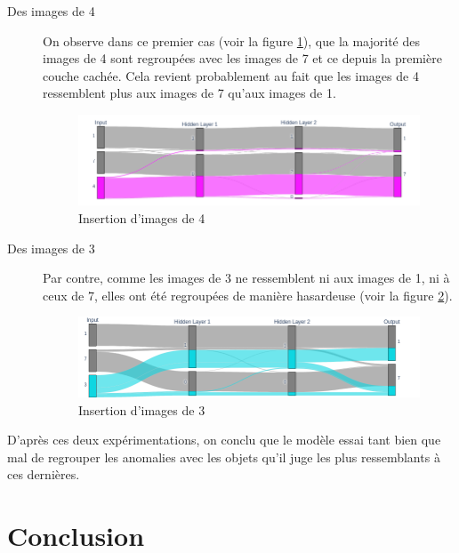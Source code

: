 \documentclass[oneside,13pt,a4paper]{report}
\begin{document}
\begin{description}
\item[Des images de 4] On observe dans ce premier cas (voir la figure \ref{expe1}), que la majorité des images de 4 sont regroupées avec les images de 7 et ce depuis la première couche cachée. Cela revient probablement au fait que les images de 4 ressemblent plus aux images de 7 qu'aux images de 1.

\begin{figure}[!h]
\begin{center}
\includegraphics[width=1.0\textwidth]{img/anomalie4_sankey.png}
\caption{Insertion d'images de 4}
\label{expe1}
\end{center}
\end{figure}

\item[Des images de 3] Par contre, comme les images de 3 ne ressemblent ni aux images de 1, ni à ceux de 7, elles ont été regroupées de manière hasardeuse (voir la figure \ref{expe2}).

\begin{figure}[!h]
\begin{center}
\includegraphics[width=1.0\textwidth]{img/anomalie3_sankey.png}
\caption{Insertion d'images de 3}
\label{expe2}
\end{center}
\end{figure}
\end{description}

D'après ces deux expérimentations, on conclu que le modèle essai tant bien que mal de regrouper les anomalies avec les objets qu'il juge les plus ressemblants à ces dernières.

\section{Conclusion}
\end{document}
